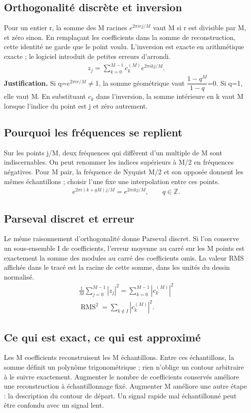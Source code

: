 \documentclass[11pt,a4paper]{article}
\begin{document}
\subsection{Orthogonalité discrète et inversion}
Pour un entier r, la somme des M racines $e^{2\pi irj/M}$ vaut M si r est divisible par M, et zéro sinon. En remplaçant les coefficients dans la somme de reconstruction, cette identité ne garde que le point voulu. L’inversion est exacte en arithmétique exacte ; le logiciel introduit de petites erreurs d’arrondi.
\[\begin{gathered}z_j=\sum_{k=0}^{M-1}c_k^{(M)}e^{2\pi ikj/M}.\end{gathered}\]
\textbf{Justification.} Si q=$e^{2\pi ir/M}$$\ne$1, la somme géométrique vaut $\dfrac{1-q^M}{1-q}$=0. Si q=1, elle vaut M. En substituant $c_k$ dans l’inversion, la somme intérieure en k vaut M lorsque l’indice du point est j et zéro autrement.
\subsection{Pourquoi les fréquences se replient}
Sur les points j/M, deux fréquences qui diffèrent d’un multiple de M sont indiscernables. On peut renommer les indices supérieurs à M/2 en fréquences négatives. Pour M pair, la fréquence de Nyquist M/2 et son opposée donnent les mêmes échantillons ; choisir l’une fixe une interpolation entre ces points.
\[\begin{gathered}e^{2\pi i(k+qM)j/M}=e^{2\pi ikj/M},\qquad q\in\mathbb Z.\end{gathered}\]
\subsection{Parseval discret et erreur}
Le même raisonnement d’orthogonalité donne Parseval discret. Si l’on conserve un sous-ensemble I de coefficients, l’erreur moyenne au carré sur les M points est exactement la somme des modules au carré des coefficients omis. La valeur RMS affichée dans le tracé est la racine de cette somme, dans les unités du dessin normalisé.
\[\begin{gathered}\frac1M\sum_{j=0}^{M-1}|z_j|^2=\sum_{k=0}^{M-1}|c_k^{(M)}|^2\\ \operatorname{RMS}^2=\sum_{k\notin I}|c_k^{(M)}|^2.\end{gathered}\]
\subsection{Ce qui est exact, ce qui est approximé}
Les M coefficients reconstruisent les M échantillons. Entre ces échantillons, la somme définit un polynôme trigonométrique ; rien n’oblige un contour arbitraire à le suivre exactement. Augmenter le nombre de coefficients conservés améliore une reconstruction à échantillonnage fixé. Augmenter M améliore une autre étape : la description du contour de départ. Un signal rapide mal échantillonné peut être confondu avec un signal lent.
\end{document}
